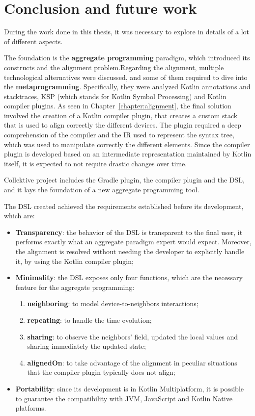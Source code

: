 \chapter{Conclusion and future work}\label{chapter:conclusion}
During the work done in this thesis, it was necessary to explore in details of a lot of different aspects.

The foundation is the \textbf{aggregate programming} paradigm, which introduced its constructs and the alignment problem.\newline Regarding the alignment, multiple technological alternatives were discussed, and some of them required to dive into the \textbf{metaprogramming}. Specifically, they were analyzed Kotlin annotations and stacktraces, KSP (which stands for Kotlin Symbol Processing) and Kotlin compiler plugins.\newline
As seen in Chapter~\ref{chapter:alignment}, the final solution involved the creation of a Kotlin compiler plugin, that creates a custom stack that is used to align correctly the different devices. The plugin required a deep comprehension of the compiler and the IR used to represent the syntax tree, which was used to manipulate correctly the different elements.\newline
Since the compiler plugin is developed based on an intermediate representation maintained by Kotlin itself, it is expected to not require drastic changes over time.

Collektive project includes the Gradle plugin, the compiler plugin and the DSL, and it lays the foundation of a new aggregate programming tool.

The DSL created achieved the requirements established before its development, which are:
\begin{itemize}
    \item \textbf{Transparency}: the behavior of the DSL is transparent to the final user, it performs exactly what an aggregate paradigm expert would expect. Moreover, the alignment is resolved without needing the developer to explicitly handle it, by using the Kotlin compiler plugin;
    \item \textbf{Minimality}: the DSL exposes only four functions, which are the necessary feature for the aggregate programming:
    \begin{enumerate}
        \item \textbf{neighboring}: to model device-to-neighbors interactions;
        \item \textbf{repeating}: to handle the time evolution;
        \item \textbf{sharing}: to observe the neighbors' field, updated the local values and sharing immediately the updated state;
        \item \textbf{alignedOn}: to take advantage of the alignment in peculiar situations that the compiler plugin typically does not align;
    \end{enumerate}
    \item \textbf{Portability}: since its development is in Kotlin Multiplatform, it is possible to guarantee the compatibility with JVM, JavaScript and Kotlin Native platforms.
\end{itemize}

